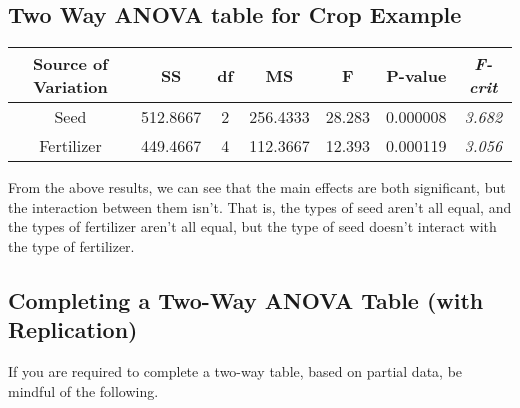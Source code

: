 \documentclass[12pt]{article}
\begin{document}
	\subsection*{Two Way ANOVA table for Crop Example}
	
	\begin{center}
		\begin{tabular}{|c|c|c|c|c|c|c|}
			\hline Source of Variation	&	SS	&	df	&	MS	&	F	&	P-value	&	\textit{F-crit}		\\	\hline
			Seed	&	512.8667	&	2	&	256.4333	&	28.283	&	0.000008	&	\textit{3.682}		\\	\hline
			Fertilizer	&	449.4667	&	4	&	112.3667	&	12.393	&	0.000119	&	\textit{3.056}		\\	\hline
		\end{tabular} 	 	 	 
	\end{center}
	
	From the above results, we can see that the main effects are both significant, but the interaction between them isn't. That is, the types of seed aren't all equal, and the types of fertilizer aren't all equal, but the type of seed doesn't interact with the type of fertilizer.



\newpage
\subsection*{Completing a Two-Way ANOVA Table (with Replication)}
	
	
If you are required to complete a two-way table, based on partial data, be mindful of the following.
	
\end{document}
